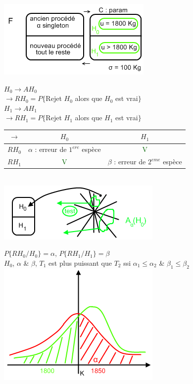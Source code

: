 \documentclass{article}
\begin{document}
\includegraphics{Figure2-13.png}

\noindent $H_0 \rightarrow AH_0$ \\
\indent $\rightarrow RH_0 = P\{$Rejet $H_0$ alors que $H_0$ est vrai$\}$ \\
$H_1 \rightarrow AH_1$ \\
\indent $\rightarrow RH_1 = P\{$Rejet $H_1$ alors que $H_1$ est vrai$\}$ \\

\begin{tabular}{|*{3}{c|}}
\hline
$\rightarrow$ & $H_0$ & $H_1$  \\
\hline
$RH_0$ & $\alpha$ : erreur de $1^{ere}$ espèce & \textcolor{darkgreen}{V} \\
\hline
$RH_1$ & \textcolor{darkgreen}{V} & $\beta$ : erreur de $2^{eme}$ espèce\\
\hline
\end{tabular} \\

\includegraphics{Figure2-14.png}

$P\{RH_0/H_0\} = \alpha$, $P\{RH_1/H_1\} = \beta$ \\

$H_0$, $\alpha$ \& $\beta$, $T_1$ est plus puissant que $T_2$ ssi $\alpha_1 \leq \alpha_2$ \& $\beta_1 \leq \beta_2$ \\

\includegraphics{Figure2-15.png}
\end{document}
